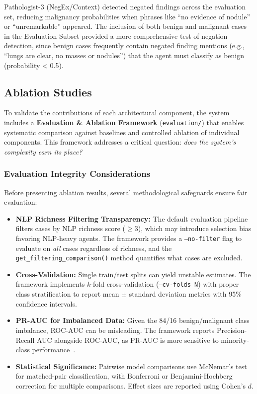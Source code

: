 \documentclass[12pt]{article}
\begin{document}
Pathologist-3 (NegEx/Context) detected negated findings across the evaluation set, reducing malignancy probabilities when phrases like ``no evidence of nodule'' or ``unremarkable'' appeared. The inclusion of both benign and malignant cases in the Evaluation Subset provided a more comprehensive test of negation detection, since benign cases frequently contain negated finding mentions (e.g., ``lungs are clear, no masses or nodules'') that the agent must classify as benign (probability < 0.5).


\subsection{Ablation Studies}
\label{subsec:ablation-framework}

To validate the contributions of each architectural component, the system includes a \textbf{Evaluation \& Ablation Framework} (\texttt{evaluation/}) that enables systematic comparison against baselines and controlled ablation of individual components. This framework addresses a critical question: \emph{does the system's complexity earn its place?}

\subsubsection{Evaluation Integrity Considerations}

Before presenting ablation results, several methodological safeguards ensure fair evaluation:

\begin{itemize}
    \item \textbf{NLP Richness Filtering Transparency:} The default evaluation pipeline filters cases by NLP richness score ($\geq 3$), which may introduce selection bias favoring NLP-heavy agents. The framework provides a \texttt{--no-filter} flag to evaluate on \emph{all} cases regardless of richness, and the \texttt{get\_filtering\_comparison()} method quantifies what cases are excluded.
    \item \textbf{Cross-Validation:} Single train/test splits can yield unstable estimates. The framework implements $k$-fold cross-validation (\texttt{--cv-folds N}) with proper class stratification to report mean $\pm$ standard deviation metrics with 95\% confidence intervals.
    \item \textbf{PR-AUC for Imbalanced Data:} Given the 84/16 benign/malignant class imbalance, ROC-AUC can be misleading. The framework reports Precision-Recall AUC alongside ROC-AUC, as PR-AUC is more sensitive to minority-class performance~\cite{davis2006prauc}.
    \item \textbf{Statistical Significance:} Pairwise model comparisons use McNemar's test~\cite{mcnemar1947note} for matched-pair classification, with Bonferroni or Benjamini-Hochberg correction for multiple comparisons. Effect sizes are reported using Cohen's $d$.
\end{itemize}
\end{document}
